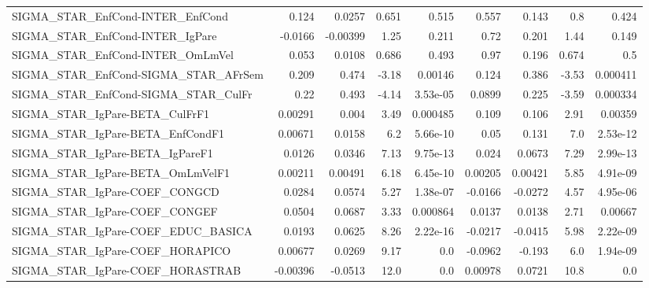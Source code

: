 \begin{tabular}{lrrrrrrrr}
SIGMA\_STAR\_EnfCond-INTER\_EnfCond      &       0.124 &       0.0257 &   0.651 &    0.515 &      0.557 &       0.143 &          0.8 &         0.424 \\
SIGMA\_STAR\_EnfCond-INTER\_IgPare       &     -0.0166 &     -0.00399 &    1.25 &    0.211 &       0.72 &       0.201 &         1.44 &         0.149 \\
SIGMA\_STAR\_EnfCond-INTER\_OmLmVel      &       0.053 &       0.0108 &   0.686 &    0.493 &       0.97 &       0.196 &        0.674 &           0.5 \\
SIGMA\_STAR\_EnfCond-SIGMA\_STAR\_AFrSem  &       0.209 &        0.474 &   -3.18 &  0.00146 &      0.124 &       0.386 &        -3.53 &      0.000411 \\
SIGMA\_STAR\_EnfCond-SIGMA\_STAR\_CulFr   &        0.22 &        0.493 &   -4.14 & 3.53e-05 &     0.0899 &       0.225 &        -3.59 &      0.000334 \\
SIGMA\_STAR\_IgPare-BETA\_CulFrF1        &     0.00291 &        0.004 &    3.49 & 0.000485 &      0.109 &       0.106 &         2.91 &       0.00359 \\
SIGMA\_STAR\_IgPare-BETA\_EnfCondF1      &     0.00671 &       0.0158 &     6.2 & 5.66e-10 &       0.05 &       0.131 &          7.0 &      2.53e-12 \\
SIGMA\_STAR\_IgPare-BETA\_IgPareF1       &      0.0126 &       0.0346 &    7.13 & 9.75e-13 &      0.024 &      0.0673 &         7.29 &      2.99e-13 \\
SIGMA\_STAR\_IgPare-BETA\_OmLmVelF1      &     0.00211 &      0.00491 &    6.18 & 6.45e-10 &    0.00205 &     0.00421 &         5.85 &      4.91e-09 \\
SIGMA\_STAR\_IgPare-COEF\_CONGCD         &      0.0284 &       0.0574 &    5.27 & 1.38e-07 &    -0.0166 &     -0.0272 &         4.57 &      4.95e-06 \\
SIGMA\_STAR\_IgPare-COEF\_CONGEF         &      0.0504 &       0.0687 &    3.33 & 0.000864 &     0.0137 &      0.0138 &         2.71 &       0.00667 \\
SIGMA\_STAR\_IgPare-COEF\_EDUC\_BASICA    &      0.0193 &       0.0625 &    8.26 & 2.22e-16 &    -0.0217 &     -0.0415 &         5.98 &      2.22e-09 \\
SIGMA\_STAR\_IgPare-COEF\_HORAPICO       &     0.00677 &       0.0269 &    9.17 &      0.0 &    -0.0962 &      -0.193 &          6.0 &      1.94e-09 \\
SIGMA\_STAR\_IgPare-COEF\_HORASTRAB      &    -0.00396 &      -0.0513 &    12.0 &      0.0 &    0.00978 &      0.0721 &         10.8 &           0.0 \\

\end{tabular}
